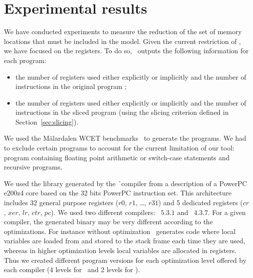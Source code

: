 \section{Experimental results}
\label{sec:results}


  We have conducted experiments to measure the reduction of the set of memory
  locations that must be included in the model. Given the current restriction of
  \best{}, we have focused on the registers. To do so, \best\ outputs the
  following information for each program:
  \begin{itemize}
    \item the number of registers used either explicitly or implicitly and the
      number of instructions in the original program ;
    \item the number of registers used either explicitly or implicitly and the
      number of instructions in the sliced program (using the slicing criterion
      defined in Section~\ref{sec:slicing}).
  \end{itemize}
 

  We used the Mälardalen WCET benchmarks~\cite{Gustafsson:WCET2010:Benchmarks}
  to generate the programs. We had to exclude certain programs to account for the
  current limitation of our tool: program containing floating point arithmetic
  or switch-case statements and recursive programs.

  We used the library generated by the \h\ compiler from a description of a
  PowerPC e200z4 core based on the 32 bits PowerPC instruction set. This
  architecture includes 32 general purpose registers ($r0$, $r1$, \ldots, $r31$)
  and 5 dedicated registers ($cr$, $xer$, $lr$, $ctr$, $pc$). We used two
  different compilers: \gcc\ $5.3.1$ and \cosmic\ $4.3.7$. For a given compiler,
  the generated binary may be very different according to the optimizations. For
  instance without optimization \gcc\ generates code where local variables are
  loaded from and stored to the stack frame each time they are used, whereas in
  higher optimization levels local variables are allocated in registers. Thus we
  created different program versions for each optimization level offered by each
  compiler (4 levels for \gcc\ and 2 levels for \cosmic{}).
  
